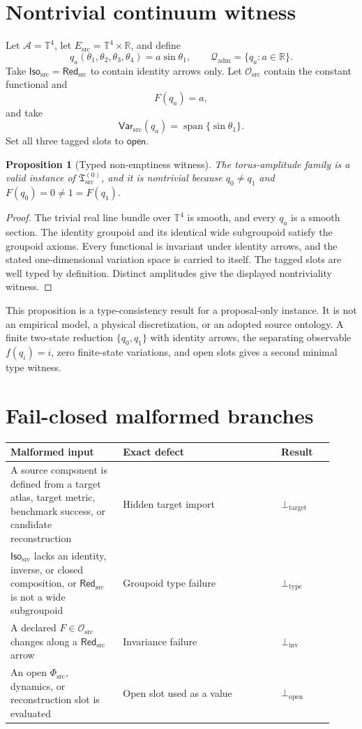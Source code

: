 \documentclass[11pt]{article}
\newcommand{\A}{\mathcal A}
\newcommand{\Esrc}{E_{\mathrm{src}}}
\newcommand{\Qadm}{\mathcal Q_{\mathrm{adm}}}
\newcommand{\Isosrc}{\mathsf{Iso}_{\mathrm{src}}}
\newcommand{\Redsrc}{\mathsf{Red}_{\mathrm{src}}}
\newcommand{\Osrc}{\mathcal O_{\mathrm{src}}}
\newcommand{\Varsrc}{\mathsf{Var}_{\mathrm{src}}}
\newcommand{\PhiSrc}{\Phi_{\mathrm{src}}}
\newcommand{\Open}{\mathsf{open}}
\newtheorem{proposition}{Proposition}
\begin{document}
\section{Nontrivial continuum witness}

Let \(\A=\mathbb T^4\), let
\(\Esrc=\mathbb T^4\times\mathbb R\), and define
\[
  q_a(\theta_1,\theta_2,\theta_3,\theta_4)
  = a\sin\theta_1,
  \qquad
  \Qadm=\{q_a:a\in\mathbb R\}.
\]
Take \(\Isosrc=\Redsrc\) to contain identity arrows only. Let
\(\Osrc\) contain the constant functional and
\[
  F(q_a)=a,
\]
and take
\[
  \Varsrc(q_a)
  =
  \operatorname{span}\{\sin\theta_1\}.
\]
Set all three tagged slots to \(\Open\).

\begin{proposition}[Typed non-emptiness witness]
The torus-amplitude family is a valid instance of
\(\mathfrak T_{\mathrm{src}}^{(0)}\), and it is nontrivial because
\(q_0\ne q_1\) and \(F(q_0)=0\ne1=F(q_1)\).
\end{proposition}

\begin{proof}
The trivial real line bundle over \(\mathbb T^4\) is smooth, and every \(q_a\)
is a smooth section. The identity groupoid and its identical wide subgroupoid
satisfy the groupoid axioms. Every functional is invariant under identity
arrows, and the stated one-dimensional variation space is carried to itself.
The tagged slots are well typed by definition. Distinct amplitudes give the
displayed nontriviality witness.
\end{proof}

This proposition is a type-consistency result for a proposal-only instance.
It is not an empirical model, a physical discretization, or an adopted source
ontology. A finite two-state reduction
\(\{q_0,q_1\}\) with identity arrows, the separating observable
\(f(q_i)=i\), zero finite-state variations, and open slots gives a second
minimal type witness.

\section{Fail-closed malformed branches}

\begin{longtable}{p{0.32\linewidth}p{0.45\linewidth}p{0.15\linewidth}}
\toprule
Malformed input & Exact defect & Result \\
\midrule
\endhead
A source component is defined from a target atlas, target metric, benchmark
success, or candidate reconstruction
& Hidden target import
& \(\bot_{\mathrm{target}}\) \\
\(\Isosrc\) lacks an identity, inverse, or closed composition, or
\(\Redsrc\) is not a wide subgroupoid
& Groupoid type failure
& \(\bot_{\mathrm{type}}\) \\
A declared \(F\in\Osrc\) changes along a \(\Redsrc\) arrow
& Invariance failure
& \(\bot_{\mathrm{inv}}\) \\
An open \(\PhiSrc\), dynamics, or reconstruction slot is evaluated
& Open slot used as a value
& \(\bot_{\mathrm{open}}\) \\
\bottomrule
\end{longtable}
\end{document}
